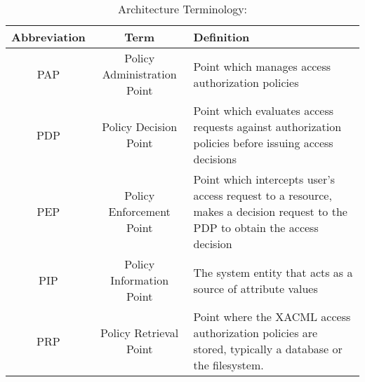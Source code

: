 \begin{table}[]
    \centering
    \begin{tabular}{| c | c | p{8cm} |} 
          \hline
          Abbreviation & Term & Definition\\ [0.5ex] 
          \hline
          PAP & 
          Policy Administration Point &
          Point which manages access authorization policies
          \\ 
          \hline
          PDP &
          Policy Decision Point &
          Point which evaluates access requests against authorization policies before issuing access decisions
          \\
          \hline
          PEP &
          Policy Enforcement Point &
          Point which intercepts user's access request to a resource, makes a decision request to the PDP to obtain the access decision
          \\
          \hline
          PIP &
          Policy Information Point & 
          The system entity that acts as a source of attribute values
          \\
          \hline
          PRP &
          Policy Retrieval Point & 
          Point where the XACML access authorization policies are stored, typically a database or the filesystem. 
          \\ [1ex] 
          \hline
    \end{tabular}
    \caption{Architecture Terminology:\cite{rfc_2904}}
    \label{tab:my_label}
\end{table}
